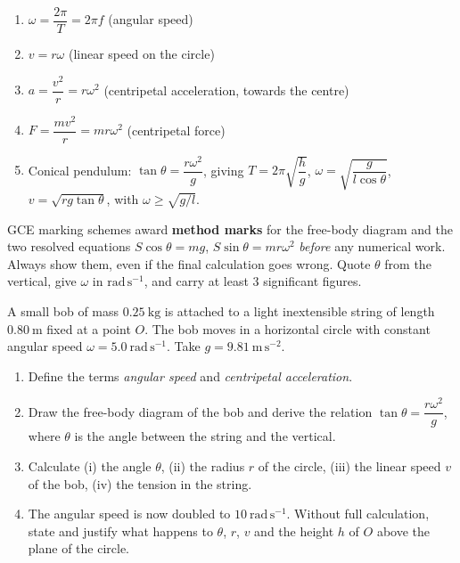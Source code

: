 \documentclass[11pt]{article}
\newcounter{popsec}
\newcounter{popsub}
\newcommand{\courssub}[1]{%
  \stepcounter{popsub}%
  \par\vspace{9pt}\noindent{\popxbold\fontsize{11.5}{13}\selectfont\color{popink}{\color{poporange}\thepopsec.\thepopsub}\hspace{6pt}#1}\par\nopagebreak\vspace{4pt}
}
\begin{document}
\begin{aretenir}
\begin{enumerate}
\item $\omega = \dfrac{2\pi}{T} = 2\pi f$ \quad (angular speed)
\item $v = r\omega$ \quad (linear speed on the circle)
\item $a = \dfrac{v^{2}}{r} = r\omega^{2}$ \quad (centripetal acceleration, towards the centre)
\item $F = \dfrac{mv^{2}}{r} = mr\omega^{2}$ \quad (centripetal force)
\item Conical pendulum: $\tan\theta = \dfrac{r\omega^{2}}{g}$, giving $T = 2\pi\sqrt{\dfrac{h}{g}}$, $\omega = \sqrt{\dfrac{g}{l\cos\theta}}$, $v = \sqrt{rg\tan\theta}$, with $\omega \geq \sqrt{g/l}$.
\end{enumerate}
\end{aretenir}

\courssub{Timed GCE-Style Practice}

\begin{attention}
GCE marking schemes award \textbf{method marks} for the free-body diagram and the two resolved equations $S\cos\theta = mg$, $S\sin\theta = mr\omega^{2}$ \emph{before} any numerical work. Always show them, even if the final calculation goes wrong. Quote $\theta$ from the vertical, give $\omega$ in $\mathrm{rad\,s^{-1}}$, and carry at least 3 significant figures.
\end{attention}

\begin{exercice}
A small bob of mass $0.25\ \mathrm{kg}$ is attached to a light inextensible string of length $0.80\ \mathrm{m}$ fixed at a point $O$. The bob moves in a horizontal circle with constant angular speed $\omega = 5.0\ \mathrm{rad\,s^{-1}}$. Take $g = 9.81\ \mathrm{m\,s^{-2}}$.
\begin{enumerate}
\item Define the terms \emph{angular speed} and \emph{centripetal acceleration}.
\item Draw the free-body diagram of the bob and derive the relation $\tan\theta = \dfrac{r\omega^{2}}{g}$, where $\theta$ is the angle between the string and the vertical.
\item Calculate (i) the angle $\theta$, (ii) the radius $r$ of the circle, (iii) the linear speed $v$ of the bob, (iv) the tension in the string.
\item The angular speed is now doubled to $10\ \mathrm{rad\,s^{-1}}$. Without full calculation, state and justify what happens to $\theta$, $r$, $v$ and the height $h$ of $O$ above the plane of the circle.
\end{enumerate}
\end{exercice}
\end{document}

